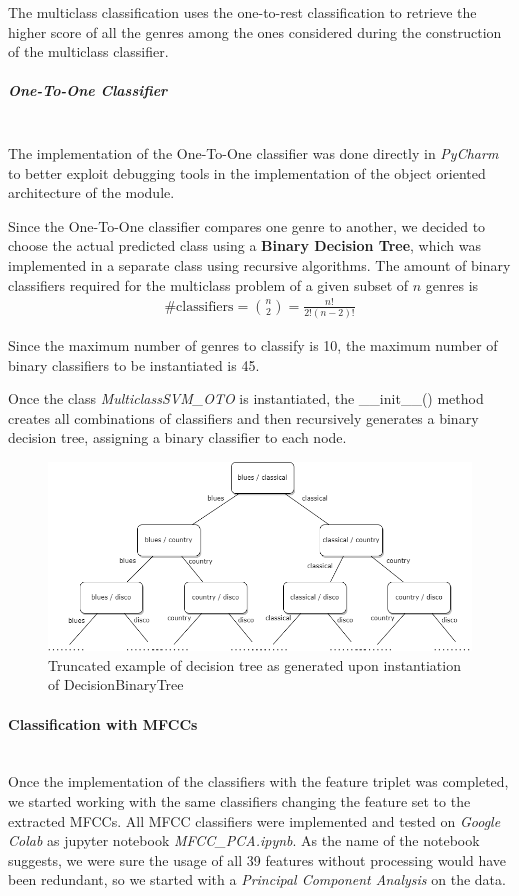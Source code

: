 \documentclass[12pt]{article}
\begin{document}
	The multiclass classification uses the one-to-rest classification to retrieve the higher score of all the genres among the ones considered during the construction of the multiclass classifier.
	\newpage
	\subparagraph{One-To-One Classifier}\mbox{}\\\newline
	The implementation of the One-To-One classifier was done directly in \textit{PyCharm} to better exploit debugging tools in the implementation of the object oriented architecture of the module.
	
	Since the One-To-One classifier compares one genre to another, we decided to choose the actual predicted class using a \textbf{Binary Decision Tree}, which was implemented in a separate class using recursive algorithms. The amount of binary classifiers required for the multiclass problem of a given subset of $\mathit{n}$ genres is
	\begin{align}
		\text{\# classifiers} = \binom{n}{2} = \frac{n!}{2!(n-2)!}
	\end{align}

	Since the maximum number of genres to classify is 10, the maximum number of binary classifiers to be instantiated is 45.
	
	Once the class \textit{MulticlassSVM\_OTO} is instantiated, the \_\_init\_\_() method creates all combinations of classifiers and then recursively generates a binary decision tree, assigning a binary classifier to each node.
	\begin{figure}[H]
		\hspace{70pt}\includegraphics[scale=0.44]{decision_tree}
		\caption{Truncated example of decision tree as generated upon instantiation of DecisionBinaryTree}
	\end{figure}
	\newpage
	
	\paragraph{Classification with MFCCs}\mbox{}\\
	Once the implementation of the classifiers with the feature triplet was completed, we started working with the same classifiers changing the feature set to the extracted MFCCs. All MFCC classifiers were implemented and tested on \textit{Google Colab} as jupyter notebook \textit{MFCC\_PCA.ipynb}. As the name of the notebook suggests, we were sure the usage of all 39 features without processing would have been redundant, so we started with a \textit{Principal Component Analysis} on the data.
	
\end{document}
